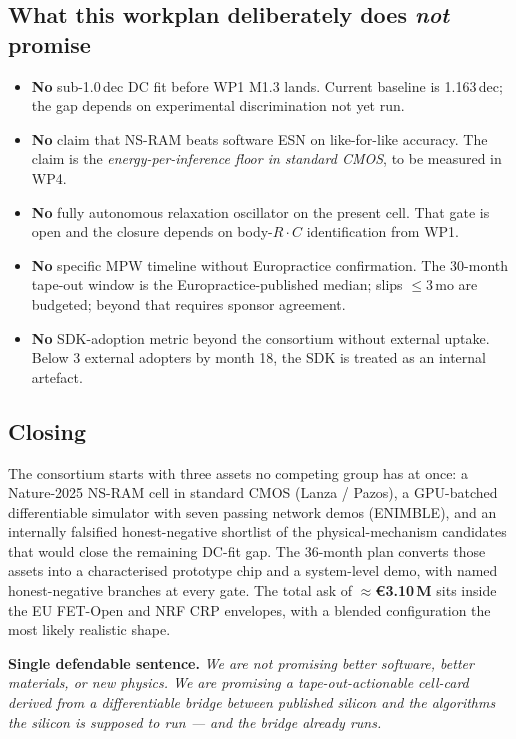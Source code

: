 \subsection{What this workplan deliberately does \emph{not} promise}

\begin{itemize}[leftmargin=1.4em, topsep=2pt, itemsep=1pt]
\item \textbf{No} sub-1.0\,dec DC fit before WP1 M1.3 lands. Current
baseline is 1.163\,dec; the gap depends on experimental discrimination
not yet run.
\item \textbf{No} claim that NS-RAM beats software ESN on like-for-like
accuracy. The claim is the \emph{energy-per-inference floor in standard
CMOS}, to be measured in WP4.
\item \textbf{No} fully autonomous relaxation oscillator on the present
cell. That gate is open and the closure depends on body-$R\!\cdot\!C$
identification from WP1.
\item \textbf{No} specific MPW timeline without Europractice
confirmation. The 30-month tape-out window is the Europractice-published
median; slips $\leq\!3$\,mo are budgeted; beyond that requires sponsor
agreement.
\item \textbf{No} SDK-adoption metric beyond the consortium without
external uptake. Below 3 external adopters by month 18, the SDK is
treated as an internal artefact.
\end{itemize}

\subsection*{Closing}

The consortium starts with three assets no competing group has at
once: a Nature-2025 NS-RAM cell in standard CMOS (Lanza / Pazos), a
GPU-batched differentiable simulator with seven passing network demos
(ENIMBLE), and an internally falsified honest-negative shortlist of the
physical-mechanism candidates that would close the remaining DC-fit
gap. The 36-month plan converts those assets into a characterised
prototype chip and a system-level demo, with named honest-negative
branches at every gate. The total ask of \textbf{$\approx$\euro 3.10\,M}
sits inside the EU FET-Open and NRF CRP envelopes, with a blended
configuration the most likely realistic shape.

\medskip
\noindent\textbf{Single defendable sentence.}
\textit{We are not promising better software, better materials, or new
physics. We are promising a tape-out-actionable cell-card derived from
a differentiable bridge between published silicon and the algorithms
the silicon is supposed to run --- and the bridge already runs.}

